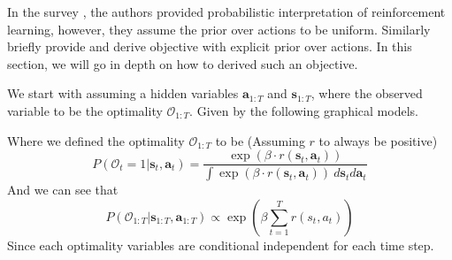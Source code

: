 In the survey \cite{levine2018reinforcement}, the authors provided probabilistic interpretation of reinforcement learning, however, they assume the prior over actions to be uniform. Similarly \cite{grau2018soft} briefly provide and derive objective with explicit prior over actions. In this section, we will go in depth on how to derived such an objective.

We start with assuming a hidden variables $\boldsymbol{a}_{1:T}$ and $\boldsymbol{s}_{1:T}$, where the observed variable to be the optimality $\mathcal{O}_{1:T}$. Given by the following graphical models.

\begin{figure}[!h]
\end{figure}

Where we defined the optimality $\mathcal{O}_{1:T}$ to be (Assuming $r$ to always be positive)
\begin{equation}
    P(\mathcal{O}_{t} = 1 | \boldsymbol{s}_{t}, \boldsymbol{a}_{t}) = \frac{\exp\left(\beta \cdot r(\boldsymbol{s}_{t}, \boldsymbol{a}_{t})\right)}{\int \exp(\beta \cdot r(\boldsymbol{s}_{t}, \boldsymbol{a}_{t})) \ d\boldsymbol{s}_{t} d\boldsymbol{a}_{t}}
\end{equation}
And we can see that 
\begin{equation}
    P(\mathcal{O}_{1:T} | \boldsymbol{s}_{1:T}, \boldsymbol{a}_{1:T}) \propto \exp \left( \beta \sum^T_{t=1} r(s_t, a_t) \right)
\end{equation}
Since each optimality variables are conditional independent for each time step. 

